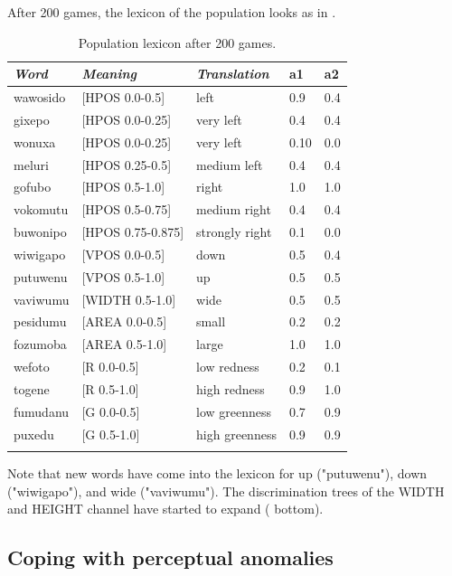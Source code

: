 After 200 games, the lexicon of the population looks as in . 
\begin{table}
\begin{center}
\begin{tabular}{ l  l  l  l  l }
\lsptoprule
{\it Word}&{\it Meaning}&{\it Translation} & {\bf a1}&{\bf a2} \\ \midrule
wawosido & [HPOS 0.0-0.5] &left&0.9&0.4\\ \midrule
gixepo & [HPOS 0.0-0.25] & very left&0.4&0.4\\ \midrule
wonuxa & [HPOS 0.0-0.25] & very left&0.10&0.0\\ \midrule
meluri & [HPOS 0.25-0.5] &medium left&0.4&0.4\\ \midrule
gofubo & [HPOS 0.5-1.0]& right&1.0&1.0\\ \midrule
vokomutu & [HPOS 0.5-0.75] &medium right&0.4&0.4\\ \midrule
buwonipo & [HPOS 0.75-0.875] &strongly right&0.1&0.0\\ \midrule
wiwigapo & [VPOS 0.0-0.5] &down&0.5&0.4\\ \midrule
putuwenu & [VPOS 0.5-1.0]&up & 0.5&0.5\\ \midrule
vaviwumu & [WIDTH 0.5-1.0]&wide & 0.5&0.5\\ \midrule
pesidumu & [AREA 0.0-0.5]&small& 0.2&0.2\\ \midrule
fozumoba & [AREA 0.5-1.0]&large & 1.0&1.0\\ \midrule
wefoto & [R 0.0-0.5]& low redness &0.2&0.1\\ \midrule
togene & [R 0.5-1.0]& high redness &0.9&1.0\\ \midrule
fumudanu & [G 0.0-0.5]& low greenness &0.7&0.9\\ \midrule
puxedu & [G 0.5-1.0]& high greenness &0.9&0.9\\ \midrule
\lspbottomrule
\end{tabular}
\caption{ \label{tab:upper} Population lexicon after 200 games.}
\end{center}
\end{table}
Note that new words have come into the lexicon 
for up ("putuwenu"), down ("wiwigapo"), and 
wide ("vaviwumu"). The discrimination trees of 
the WIDTH and HEIGHT channel have started to 
expand ( bottom). 

\subsection{Coping with perceptual anomalies}

